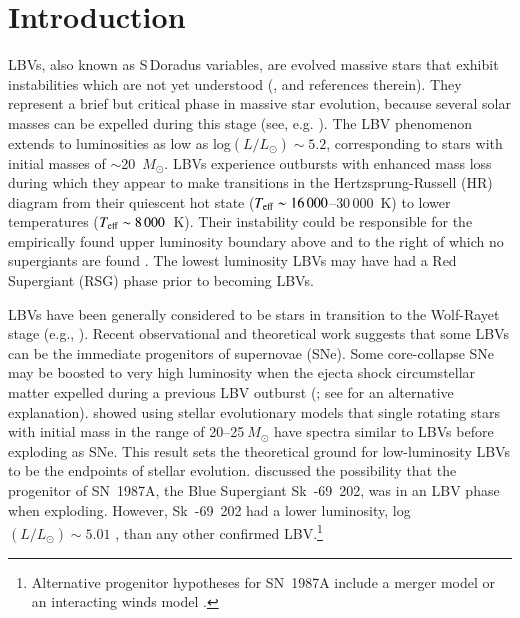 \documentclass[structabstract]{aa}
\begin{document}

\maketitle 


\section{Introduction}
\label{intro}

LBVs, also known as S\,Doradus variables, are evolved massive stars that exhibit instabilities which are not yet understood (\citealt{1984IAUS..105..233C,1997ASPC..120..387C,1994PASP..106.1025H,1997ASPC..120.....N}, and references therein). They represent a brief but critical phase in massive star evolution, because several solar masses can be expelled during this stage (see, e.g. \citealt{2014A&A...564A..30G}).   The LBV phenomenon extends to luminosities as low as log$(L / L_{\odot})\sim5.2$, corresponding to stars with initial masses of $\sim$20~$M_{\odot}$. LBVs experience outbursts with enhanced mass loss during which they appear to make transitions in the Hertzsprung-Russell (HR) diagram from their quiescent hot state ($T_{\textnormal{\scriptsize{eff}}}\sim16\,000$--$30\,000$~K) to lower temperatures ($T_{\textnormal{\scriptsize{eff}}}\sim8\,000$~K).   
Their instability could be responsible for the empirically found upper luminosity boundary above and to the right of which no supergiants are found \citep{1979ApJ...232..409H,1984Sci...223..243H}. The lowest luminosity LBVs may have had a Red Supergiant (RSG) phase prior to becoming LBVs.

LBVs have been generally considered to be stars in transition to the Wolf-Rayet stage (e.g., \citealt{1983A&A...120..113M,1994PASP..106.1025H,1994A&A...290..819L}). Recent observational and theoretical work suggests that some LBVs can be the immediate progenitors of supernovae (SNe). Some core-collapse SNe may be boosted to very high luminosity when the ejecta shock circumstellar matter expelled during a previous LBV outburst (\citealt{2007ApJ...656..372G,2009Natur.458..865G,2007ApJ...666.1116S,2008ApJ...686..467S}; see \citealt{2012MNRAS.423L..92Q} for an alternative explanation).
\citet{2013A&A...550L...7G} showed using stellar evolutionary models that single rotating stars with initial mass in the range of 20--25$~M_{\odot}$ have spectra similar to LBVs before exploding as SNe. This result sets the theoretical ground for low-luminosity LBVs to be the endpoints of stellar evolution. 
\citet{2007AJ....133.1034S} discussed the possibility that the progenitor of SN~1987A, the Blue Supergiant Sk~-69~202, was in an LBV phase when exploding. However, Sk~-69~202 had a lower luminosity, log$(L / L_{\odot})\sim 5.01$ \citep{1989ApJ...341..925B}, than any other confirmed LBV.\footnote{Alternative progenitor hypotheses for SN~1987A include a  merger model \citep{1992PASP..104..717P} or an interacting winds model \citep{2008A&A...488L..37C}.}
\end{document}
